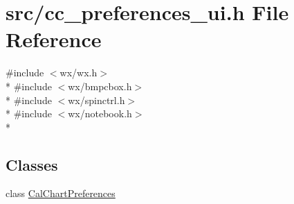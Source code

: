 \hypertarget{a00188}{\section{src/cc\-\_\-preferences\-\_\-ui.h File Reference}
\label{a00188}
}
{\ttfamily \#include $<$wx/wx.\-h$>$}\\*
{\ttfamily \#include $<$wx/bmpcbox.\-h$>$}\\*
{\ttfamily \#include $<$wx/spinctrl.\-h$>$}\\*
{\ttfamily \#include $<$wx/notebook.\-h$>$}\\*
\subsection*{Classes}
\begin{DoxyCompactItemize}
\item 
class \hyperlink{a00025}{Cal\-Chart\-Preferences}
\end{DoxyCompactItemize}
